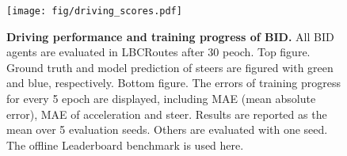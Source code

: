 %
%
%

\begin{figure}[t]
	\centering
	\texttt{[image: fig/driving\_scores.pdf]}
	\vspace{-1ex}
	\caption{\textbf{Driving performance and training progress of BID.} 
		All BID agents are evaluated in LBCRoutes after 30 peoch.
		Top figure. Ground truth and model prediction of steers are figured with green and blue, respectively.
		Bottom figure. The errors of training progress for every 5 epoch are displayed, including MAE (mean absolute error), MAE of acceleration and steer. 
		Results are reported as the mean over 5 evaluation seeds. 
		Others are evaluated with one seed. 
		The offline Leaderboard benchmark is used here.}
	\vspace{-1.5ex}
	\label{fig:score_eu_lb_tt_tn}
\end{figure}


